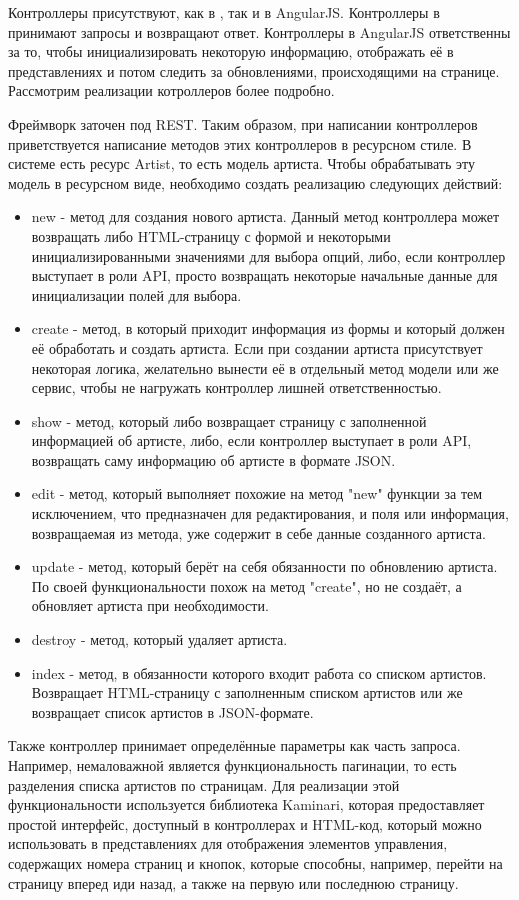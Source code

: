 Контроллеры присутствуют, как в \ror{}, так и в AngularJS. Контроллеры в \ror{} принимают запросы и возвращают ответ. Контроллеры в AngularJS ответственны за то, чтобы инициализировать некоторую информацию, отображать её в представлениях и потом следить за обновлениями, происходящими на странице. Рассмотрим реализации котроллеров более подробно.

Фреймворк \ror{} заточен под REST. Таким образом, при написании контроллеров приветствуется написание методов этих контроллеров в ресурсном стиле. В системе есть ресурс Artist, то есть модель артиста. Чтобы обрабатывать эту модель в ресурсном виде, необходимо создать реализацию следующих действий:

\begin{itemize}
  \item new - метод для создания нового артиста. Данный метод контроллера может возвращать либо HTML-страницу с формой и некоторыми инициализированными значениями для выбора опций, либо, если контроллер выступает в роли API, просто возвращать некоторые начальные данные для инициализации полей для выбора.
  \item create - метод, в который приходит информация из формы и который должен её обработать и создать артиста. Если при создании артиста присутствует некоторая логика, желательно вынести её в отдельный метод модели или же сервис, чтобы не нагружать контроллер лишней ответственностью.
  \item show - метод, который либо возвращает страницу с заполненной информацией об артисте, либо, если контроллер выступает в роли API, возвращать саму информацию об артисте в формате JSON.
  \item edit - метод, который выполняет похожие на метод "new" функции за тем исключением, что предназначен для редактирования, и поля или информация, возвращаемая из метода, уже содержит в себе данные созданного артиста.
  \item update - метод, который берёт на себя обязанности по обновлению артиста. По своей функциональности похож на метод "create", но не создаёт, а обновляет артиста при необходимости.
  \item destroy - метод, который удаляет артиста.
  \item index - метод, в обязанности которого входит работа со списком артистов. Возвращает HTML-страницу с заполненным списком артистов или же возвращает список артистов в JSON-формате.
\end{itemize}

Также контроллер принимает определённые параметры как часть запроса. Например, немаловажной является функциональность пагинации, то есть разделения списка артистов по страницам. Для реализации этой функциональности используется библиотека Kaminari, которая предоставляет простой интерфейс, доступный в контроллерах и HTML-код, который можно использовать в представлениях для отображения элементов управления, содержащих номера страниц и кнопок, которые способны, например, перейти на страницу вперед иди назад, а также на первую или последнюю страницу.

